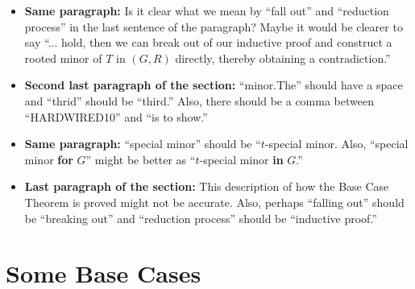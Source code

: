 \documentclass[11 pt]{article}
\begin{document}
\begin{itemize}
\item \textbf{Same paragraph:} Is it clear what we mean by ``fall out'' and ``reduction process'' in the last sentence of the paragraph? Maybe it would be clearer to say ``... hold, then we can break out of our inductive proof and construct a rooted minor of $T$ in $(G,R)$ directly, thereby obtaining a contradiction.''
\item \textbf{Second last paragraph of the section:} ``minor.The'' should have a space and ``thrid'' should be ``third.'' Also, there should be a comma between ``HARDWIRED10'' and ``is to show.'' 
\item \textbf{Same paragraph:} ``special minor'' should be ``$t$-special minor. Also, ``special minor \textbf{for} $G$'' might be better as ``$t$-special minor \textbf{in} $G$.'' 
\item \textbf{Last paragraph of the section:} This description of how the Base Case Theorem is proved might not be accurate. Also, perhaps ``falling out'' should be ``breaking out'' and ``reduction process'' should be ``inductive proof.''
\end{itemize}

\section{Some Base Cases}
\end{document}
